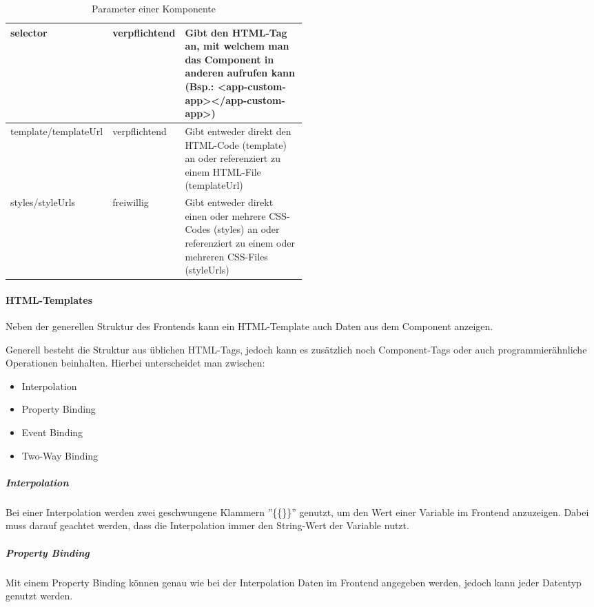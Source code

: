 \begin{table}[H]
    \centering
    \begin{tabular}{|l|l|p{0.5\linewidth}|}
        \hline
        selector             & verpflichtend & Gibt den HTML-Tag an, mit welchem man das Component in anderen aufrufen kann (Bsp.: <app-custom-app></app-custom-app>)       \\ \hline
        template/templateUrl & verpflichtend & Gibt entweder direkt den HTML-Code (template) an oder referenziert zu einem HTML-File (templateUrl)                          \\ \hline
        styles/styleUrls     & freiwillig    & Gibt entweder direkt einen oder mehrere CSS-Codes (styles) an oder referenziert zu einem oder mehreren CSS-Files (styleUrls) \\ \hline
    \end{tabular}
    \caption{Parameter einer Komponente}
\end{table}

\paragraph{HTML-Templates}

Neben der generellen Struktur des Frontends kann ein HTML-Template auch Daten aus dem Component anzeigen.



Generell besteht die Struktur aus üblichen HTML-Tags, jedoch kann es zusätzlich noch Component-Tags oder auch programmierähnliche Operationen beinhalten. Hierbei unterscheidet man zwischen:

\begin{itemize}
    \item Interpolation
    \item Property Binding
    \item Event Binding
    \item Two-Way Binding
\end{itemize}


\subparagraph{Interpolation} Bei einer Interpolation werden zwei geschwungene Klammern ''\{\{\}\}'' genutzt, um den Wert einer Variable im Frontend anzuzeigen. Dabei muss darauf geachtet werden, dass die Interpolation immer den String-Wert der Variable nutzt. \cite{ANG-IN}

\subparagraph{Property Binding} Mit einem Property Binding können genau wie bei der Interpolation Daten im Frontend angegeben werden, jedoch kann jeder Datentyp genutzt werden.

